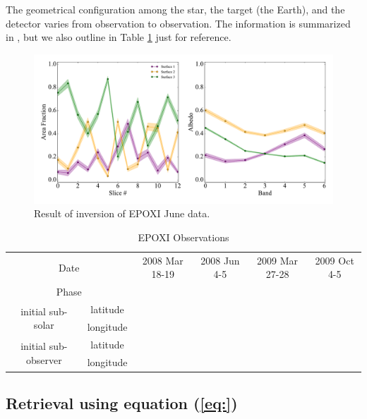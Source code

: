 \documentclass[iop,numberedappendix,apj,]{emulateapj}
\def\memoYF#1{\color{red}{\bf [#1]}\color{black}}
\begin{document}
The geometrical configuration among the star, the target (the Earth), and the detector varies from observation to observation. 
The information is summarized in \citet{Cowan2011}, but we also outline in Table \ref{tab:EPOXI} just for reference. 

\begin{figure}[!bt]
    \begin{center}
    \includegraphics[width=\hsize]{June_xmed_std_GPReg.pdf}
    \end{center}
    \caption{Result of inversion of EPOXI June data. \memoYF{to be revised}}
\label{fig:mcmc_June_tmp}
\end{figure}

\begin{table}[htp]
\caption{EPOXI Observations}
\begin{center}
\begin{tabular}{cccccc} \hline \hline
\multicolumn{2}{c}{Date} & 2008 Mar 18-19 & 2008 Jun 4-5 & 2009 Mar 27-28 & 2009 Oct 4-5 \\
\multicolumn{2}{c}{Phase} & & & & \\ \hline
\multirow{2}{*}{initial sub-solar} & latitude & & & & \\
& longitude  & & & & \\ \hline 
\multirow{2}{*}{initial sub-observer} & latitude & & & & \\
& longitude & & & & \\ \hline
\end{tabular}
\end{center}
\label{tab:EPOXI}
\end{table}%

\subsection{Retrieval using equation (\ref{eq:}) }
\label{ss:retrieval}
\end{document}

